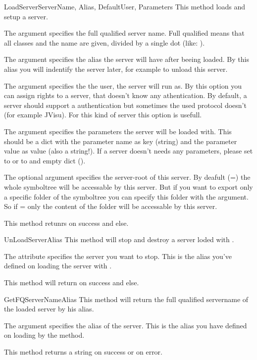 \begin{methoddesc}[System]{LoadServer}{ServerName, Alias, DefaultUser, Parameters}
This method loads and setup a server. 

The argument  specifies the full qualified server name. Full 
qualified means that all classes and the name are given, divided by a single 
dot (like: ).

The argument  specifies the alias the server will have after 
beeing loaded. By this alias you will indentify the server later, for example 
to unload this server.

The argument  specifies the the user, the server will run as. 
By this option you can assign rights to a server, that doesn't know any 
athentication. By default, a server should support a authentication but 
sometimes the used protocol doesn't (for example JVisu). For this kind of 
server this option is usefull.

The argument  specifies the parameters the server will be 
loaded with. This should be a dict with the parameter name as key (string)
and the parameter value as value (also a string!). If a server doesn't needs
any parameters, please set  to  or to and empty 
dict (\code{\{\}}). 

The optional argument  specifies the server-root of this server. 
By deafult (=) the whole symboltree will be accessable
by this server. But if you want to export only a specific folder of the 
symboltree you can specify this folder with the  argument. So
if = only the content of the folder 
will be accessable by this server.

This method retunrs  on success and  else.
\end{methoddesc}


\begin{methoddesc}[System]{UnLoadServer}{Alias}
This method will stop and destroy a server loded with .

The attribute  specifies the server you want to stop. This is the 
alias you've defined on loading the server with .

This method will return  on success and  else.
\end{methoddesc}


\begin{methoddesc}[System]{GetFQServerName}{Alias}
This method will return the full qualified servername of the loaded server
by his alias. 

The argument  specifies the alias of the server. This is the alias
you have defined on loading by the  method.

This method returns a string on success or  on error.
\end{methoddesc}


